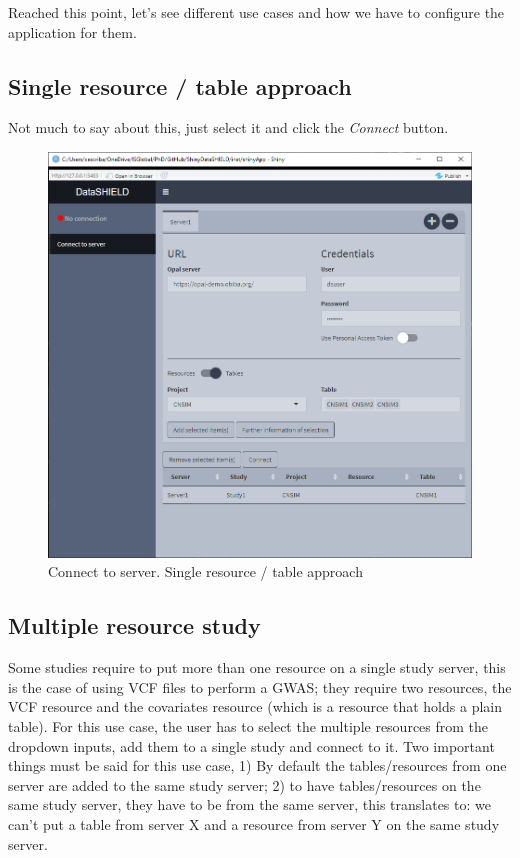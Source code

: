\documentclass[
]{book}
\begin{document}
Reached this point, let's see different use cases and how we have to configure the application for them.

\hypertarget{single-resource-table-approach}{%
\subsection{Single resource / table approach}\label{single-resource-table-approach}}

Not much to say about this, just select it and click the \emph{Connect} button.

\begin{figure}

{\centering \includegraphics[width=12.68in]{images/data_entry5} 

}

\caption{Connect to server. Single resource / table approach}\label{fig:dataentry5}
\end{figure}

\hypertarget{multiple-resource-study}{%
\subsection{Multiple resource study}\label{multiple-resource-study}}

Some studies require to put more than one resource on a single study server, this is the case of using VCF files to perform a GWAS; they require two resources, the VCF resource and the covariates resource (which is a resource that holds a plain table). For this use case, the user has to select the multiple resources from the dropdown inputs, add them to a single study and connect to it. Two important things must be said for this use case, 1) By default the tables/resources from one server are added to the same study server; 2) to have tables/resources on the same study server, they have to be from the same server, this translates to: we can't put a table from server X and a resource from server Y on the same study server.
\end{document}
